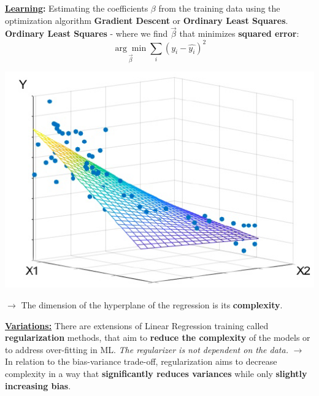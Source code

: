 \documentclass[letterpaper, 10.5pt,landscape]{article}
\begin{document}
\begin{multicols*}{3}
\vspace{2pt}

\textbf{\underline{Learning}:} Estimating the coefficients $\beta$ from the training data using the optimization algorithm
\textbf{Gradient Descent} or \textbf{Ordinary Least Squares}. \\
\textbf{Ordinary Least Squares} - where we find $\Vec{\beta}$ that minimizes \textbf{squared error}:
\vspace{-5pt}
\[\boxed{\underset{\vec{\beta}} {\arg\min} \sum_{i} \left(y_{i} - \hat{y_{i}}  \right)^2} \]

\vspace{-15pt}

\begin{center}
    \begin{minipage}{0.60\linewidth}
        \includegraphics[width=\textwidth]{figures/hyperplane_linear_regression.PNG}
    \end{minipage}   
\end{center}


\vspace{-5pt}

$\rightarrow$ The dimension of the hyperplane of the regression is its \textbf{complexity}.


\vspace{3pt}

\textbf{\underline{Variations:}} 
There are extensions of Linear Regression training called \textbf{regularization}
methods, that aim to \textbf{reduce the complexity} of the models or to address over-fitting in ML. \textit{The regularizer is not dependent on the data.}
$\rightarrow$ In relation to the bias-variance trade-off, regularization aims to decrease complexity in a way that \textbf{significantly reduces variances} while only \textbf{slightly increasing bias}. 



\end{multicols*}
\end{document}
